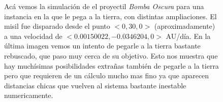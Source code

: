 \begin{figure}
{	\label{fig:res_bomba_3}
	}
	\caption{
		Acá vemos la simulación de el proyectil \textit{Bomba Oscura} para una instancia en la que le pega a la tierra,
		con distintas ampliaciones.
		El misil fue disparado desde el punto $<0,30,0>$ (aproximadamente) a una velocidad de $<0.00150022,-0.0346204,0>$ AU/día.
		En la última imagen vemos un intento de pegarle a la tierra bastante rebuscado, que paso muy cerca de su objetivo.
		Esto nos muestra que hay muchísimas posibilidades extrañas también de pegarle a la tierra pero que requieren de un cálculo mucho mas fino ya que
		aparecen distancias chicas que vuelven al sistema bastante inestable numericamente.
	}
	\label{ fig:res_bomba }
\end{figure}
